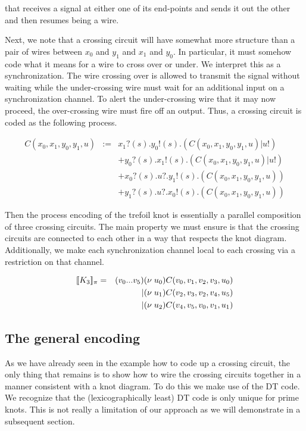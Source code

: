 \documentclass[]{llncs}
\begin{document}
that receives a signal at either one of its end-points and sends it
out the other and then resumes being a wire.

Next, we note that a crossing circuit will have somewhat more
structure than a pair of wires between $x_0$ and $y_1$ and $x_1$ and
$y_0$. In particular, it must somehow code what it means for a wire to
cross over or under. We interpret this as a synchronization. The wire
crossing over is allowed to transmit the signal without waiting while
the under-crossing wire must wait for an additional input on a
synchronization channel. To alert the under-crossing wire that it may
now proceed, the over-crossing wire must fire off an output. Thus, a
crossing circuit is coded as the following process.

\begin{eqnarray}
  C(x_0,x_1,y_0,y_1,u) & := & x_1?(s).y_0!(s).(C(x_0,x_1,y_0,y_1,u)|u!) \nonumber \\
  & & + y_0?(s).x_1!(s).(C(x_0,x_1,y_0,y_1,u)|u!) \nonumber \\
  & & + x_0?(s).u?.y_1!(s).(C(x_0,x_1,y_0,y_1,u)) \nonumber \\
  & & + y_1?(s).u?.x_0!(s).(C(x_0,x_1,y_0,y_1,u)) 
\end{eqnarray}

Then the process encoding of the trefoil knot is essentially a
parallel composition of three crossing circuits. The main property we
must ensure is that the crossing circuits are connected to each other
in a way that respects the knot diagram. Additionally, we make each
synchronization channel local to each crossing via a restriction on
that channel.

\begin{eqnarray}
  [\![ K_3 ]\!]_{\pi} & = & (v_0 ... v_{5}) (\nu \; u_0)C(v_0,v_1,v_2,v_3,u_0) \nonumber \\
  & & | (\nu \; u_1)C(v_2,v_3,v_2,v_4,u_5) \nonumber \\
  & & | (\nu \; u_2)C(v_4,v_5,v_0,v_1,u_1)
\end{eqnarray}

\subsection{The general encoding}

As we have already seen in the example how to code up a crossing
circuit, the only thing that remains is to show how to wire the
crossing circuits together in a manner consistent with a knot
diagram. To do this we make use of the DT code. We recognize that the
(lexicographically least) DT code is only unique for prime knots. This
is not really a limitation of our approach as we will demonstrate in a
subsequent section.
\end{document}
